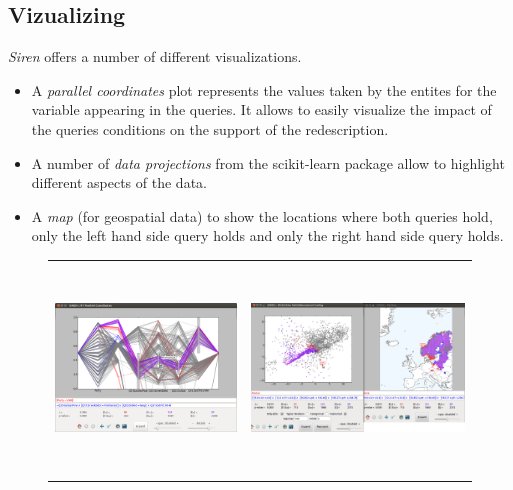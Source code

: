\documentclass[letterpaper,10pt,english]{sphinxhowto}
\begin{document}
\subsection{Vizualizing}
\label{functionalities:vizualizing}\label{functionalities:func-viz}
\emph{Siren} offers a number of different visualizations.
\begin{itemize}
\item A \emph{parallel coordinates} plot represents the values taken by the entites for the variable appearing in the queries. It allows to easily visualize the impact of the queries conditions on the support of the redescription.
\item A number of \emph{data projections} from the scikit-learn package allow to highlight different aspects of the data.
\item A \emph{map} (for geospatial data) to show the locations where both queries hold, only the left hand side query
holds and only the right hand side query holds.
\end{itemize}

\begin{figure}[h]
\begin{tabular}{cc}
\includegraphics[height=15em]{Siren_vaalikone_para.png} &
\includegraphics[height=15em]{Bio_SelectDotSideRMoose} \\
\end{tabular}
\end{figure}
\end{document}
